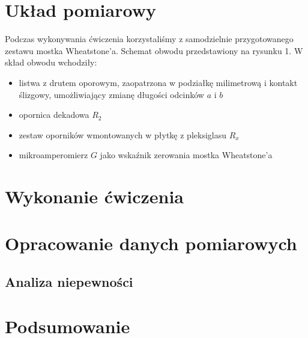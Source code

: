 \documentclass[a4paper,12pts]{article}
\begin{document}
	
	\section{Układ pomiarowy}
	
	Podczas wykonywania ćwiczenia korzystaliśmy z samodzielnie przygotowanego zestawu mostka Wheatstone'a. Schemat obwodu przedstawiony na rysunku 1. W skład obwodu wchodziły:
	
	\begin{itemize}
		\item listwa z drutem oporowym, zaopatrzona w podziałkę milimetrową i kontakt ślizgowy, umożliwiający zmianę długości odcinków $a$ i $b$
		\item opornica dekadowa $R_{2}$
		\item zestaw oporników wmontowanych w płytkę z pleksiglasu $R_{x}$
		\item mikroamperomierz $G$ jako wskaźnik zerowania mostka Wheatstone'a
		
	\end{itemize}
	

	\section{Wykonanie ćwiczenia}

	
	\section{Opracowanie danych pomiarowych}
	
	
	\subsection{Analiza niepewności}
	

	\section{Podsumowanie}

\end{document}
